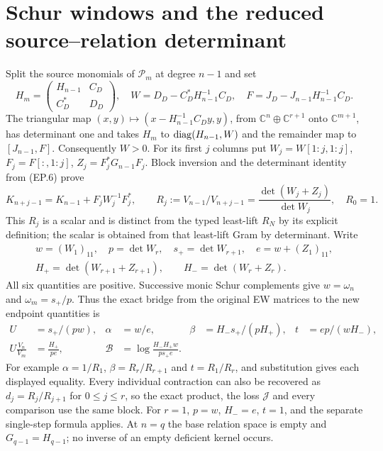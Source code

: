 \documentclass[11pt]{article}
\newcommand{\C}{\mathbb C}\newcommand{\R}{\mathbb R}
\begin{document}
\section{Schur windows and the reduced source--relation determinant}
Split the source monomials of $\mathcal P_m$ at degree $n-1$ and set
\[
 H_m=\begin{pmatrix}H_{n-1}&C_D\\C_D^*&D_D\end{pmatrix},\quad
 W=D_D-C_D^*H_{n-1}^{-1}C_D,\quad
 F=J_D-J_{n-1}H_{n-1}^{-1}C_D.\tag{EP.32}
\]
The triangular map $(x,y)\mapsto(x-H_{n-1}^{-1}C_Dy,y)$,
from $\C^n\oplus\C^{r+1}$ onto $\C^{m+1}$, has determinant one
and takes $H_m$ to $\operatorname{diag}(H_{n-1},W)$ and the remainder map to
$[J_{n-1},F]$. Consequently $W>0$. For its first $j$ columns put
$W_j=W[1:j,1:j]$, $F_j=F[:,1:j]$, $Z_j=F_j^*G_{n-1}F_j$.
Block inversion and the determinant identity from (EP.6) prove
\[
 K_{n+j-1}=K_{n-1}+F_jW_j^{-1}F_j^*,\qquad
 R_j:=V_{n-1}/V_{n+j-1}
 =\frac{\det(W_j+Z_j)}{\det W_j},\quad R_0=1.
\tag{EP.33}
\]
This $R_j$ is a scalar and is distinct from the typed least-lift
$R_N$ by its explicit definition; the scalar is obtained from that
least-lift Gram by determinant. Write
\[
 \begin{gathered}
 w=(W_1)_{11},\quad p=\det W_r,\quad s_+=\det W_{r+1},\quad
 e=w+(Z_1)_{11},\\
 H_+=\det(W_{r+1}+Z_{r+1}),\qquad H_- =\det(W_r+Z_r).
 \end{gathered}\tag{EP.34}
\]
All six quantities are positive. Successive monic Schur complements
give $w=\omega_n$ and $\omega_m=s_+/p$. Thus the exact bridge
from the original EW matrices to the new endpoint quantities is
\[
 \begin{aligned}
 U&=s_+/(pw),&\alpha&=w/e,&
 \beta&=H_-s_+/(pH_+),&t&=ep/(wH_-),\\
 U\frac{V_n}{V_m}&=\frac{H_+}{pe},&
 \mathcal B&=\log\frac{H_-H_+w}{ps_+e}.
 \end{aligned}\tag{EP.35}
\]
For example $\alpha=1/R_1$, $\beta=R_r/R_{r+1}$ and
$t=R_1/R_r$, and substitution gives each displayed equality.
Every individual contraction can also be recovered as
$d_j=R_j/R_{j+1}$ for $0\le j\le r$, so the exact product,
the loss $\mathcal J$ and every comparison use the same block.
For $r=1$, $p=w$, $H_-=e$, $t=1$, and the separate single-step
formula applies. At $n=q$ the base relation space is empty and
$G_{q-1}=H_{q-1}$; no inverse of an empty deficient kernel occurs.
\end{document}
